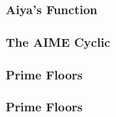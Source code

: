 \documentclass[titlepage=true]{scrartcl}
\begin{document}
        \subsubsection{Aiya's Function}
            \label{6.1.3}
            
        \newpage

        \subsubsection{The AIME Cyclic}
            \label{6.1.4}
            
        \newpage

        \subsubsection{Prime Floors}
            \label{6.1.5}
            
        \newpage

        \subsubsection{Prime Floors}
            \label{6.1.6}
            
        \newpage
\end{document}
